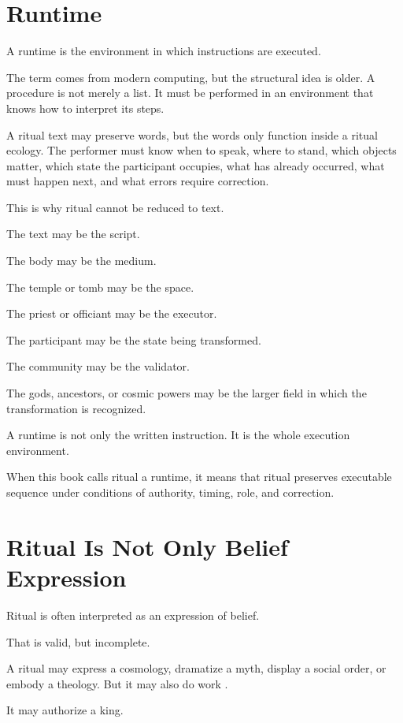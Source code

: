 \documentclass[11pt]{book}
\begin{document}
\section{Runtime}

A runtime is the environment in which instructions are executed.

The term comes from modern computing, but the structural idea is older. A procedure is not merely a list. It must be performed in an environment that knows how to interpret its steps.

A ritual text may preserve words, but the words only function inside a ritual ecology. The performer must know when to speak, where to stand, which objects matter, which state the participant occupies, what has already occurred, what must happen next, and what errors require correction.

This is why ritual cannot be reduced to text.

The text may be the script.

The body may be the medium.

The temple or tomb may be the space.

The priest or officiant may be the executor.

The participant may be the state being transformed.

The community may be the validator.

The gods, ancestors, or cosmic powers may be the larger field in which the transformation is recognized.

A runtime is not only the written instruction. It is the whole execution environment.

When this book calls ritual a runtime, it means that ritual preserves executable sequence under conditions of authority, timing, role, and correction.

\section{Ritual Is Not Only Belief Expression}

Ritual is often interpreted as an expression of belief.

That is valid, but incomplete.

A ritual may express a cosmology, dramatize a myth, display a social order, or embody a theology. But it may also do work \cite{Bell1992RitualTheory,Turner1969RitualProcess,VanGennep1960RitesPassage}.

It may authorize a king.
\end{document}
